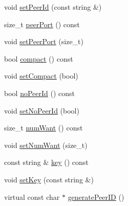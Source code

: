 \begin{DoxyCompactItemize}
\item 
void \hyperlink{classBTTrackerClientBase_a38b8f2500d5c39c8a1d079970985c877}{set\+Peer\+Id} (const string \&)
\item 
size\+\_\+t \hyperlink{classBTTrackerClientBase_ab0833d033c769937a3a51e39904f9fc0}{peer\+Port} () const 
\item 
void \hyperlink{classBTTrackerClientBase_aec9b615f0e50e53854df6b6eac0d83c2}{set\+Peer\+Port} (size\+\_\+t)
\item 
bool \hyperlink{classBTTrackerClientBase_a678dcdf76412fbed63bf9a8b0b9fc686}{compact} () const 
\item 
void \hyperlink{classBTTrackerClientBase_a251809d0b4ea9f07b2ca3c26fa4ea2b7}{set\+Compact} (bool)
\item 
bool \hyperlink{classBTTrackerClientBase_ae1a3c76c6a8605acb228748ca0a68ad6}{no\+Peer\+Id} () const 
\item 
void \hyperlink{classBTTrackerClientBase_a9b4700cf1790d17bc73d7a18078226cd}{set\+No\+Peer\+Id} (bool)
\item 
size\+\_\+t \hyperlink{classBTTrackerClientBase_a161caadc519753d4469377515c7a4fcf}{num\+Want} () const 
\item 
void \hyperlink{classBTTrackerClientBase_a21ee3296f8698ac6f49fec71e3caf57d}{set\+Num\+Want} (size\+\_\+t)
\item 
const string \& \hyperlink{classBTTrackerClientBase_a0137bb8858b6f40e1f82bb34a9009cff}{key} () const 
\item 
void \hyperlink{classBTTrackerClientBase_ad3c6c86644a0657a062ee7a6d312e4ad}{set\+Key} (const string \&)
\item 
virtual const char $\ast$ \hyperlink{classBTTrackerClientBase_ac2d122e57e8a049579b08214da47c0d5}{generate\+Peer\+I\+D} ()
\end{DoxyCompactItemize}
